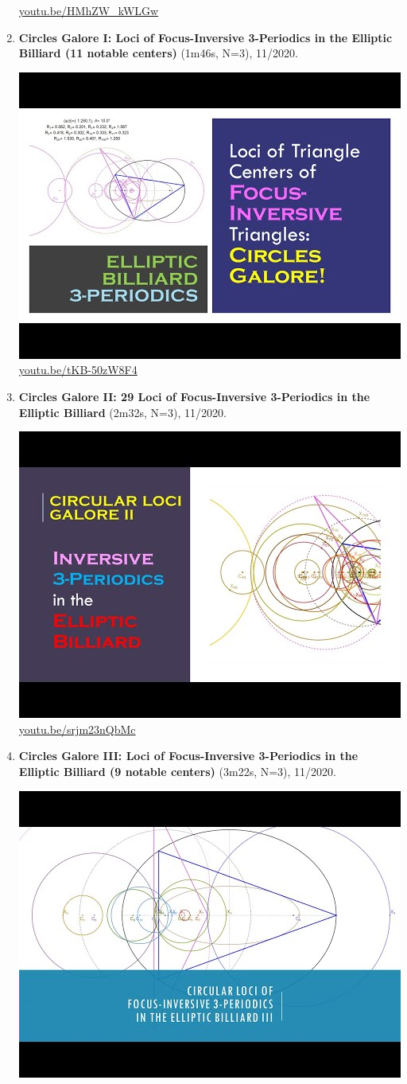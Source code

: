 \documentclass[12pt]{amsart}
\begin{document}
\begin{enumerate}[resume]
\begin{center}
\href{https://youtu.be/HMhZW_kWLGw}{\url{youtu.be/HMhZW\_kWLGw}}\end{center}
% 
\item \textbf{Circles Galore I: Loci of Focus-Inversive 3-Periodics in the Elliptic Billiard (11 notable centers)} (1m46s, N=3), 11/2020. 
\begin{center}\includegraphics[width=.5\textwidth]{pics/tKB-50zW8F4.jpg} \\ 
\href{https://youtu.be/tKB-50zW8F4}{\url{youtu.be/tKB-50zW8F4}}\end{center}
% 
\item \textbf{Circles Galore II: 29 Loci of Focus-Inversive 3-Periodics in the Elliptic Billiard} (2m32s, N=3), 11/2020. 
\begin{center}\includegraphics[width=.5\textwidth]{pics/srjm23nQbMc.jpg} \\ 
\href{https://youtu.be/srjm23nQbMc}{\url{youtu.be/srjm23nQbMc}}\end{center}
% 
\item \textbf{Circles Galore III: Loci of Focus-Inversive 3-Periodics in the Elliptic Billiard (9 notable centers)} (3m22s, N=3), 11/2020. 
\begin{center}\includegraphics[width=.5\textwidth]{pics/OAD2hpCRgCI.jpg} \\ 

\end{center}
\end{enumerate}
\end{document}
